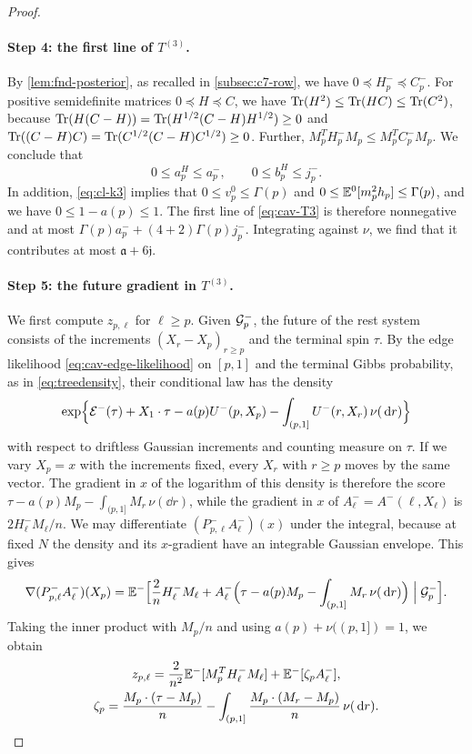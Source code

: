 \begin{proof}
\paragraph{Step 4: the first line of $T^{(3)}$.}
By \cref{lem:fnd-posterior}, as recalled in \cref{subsec:c7-row}, we
have $0\preceq H_p^-\preceq C_p^-$. For positive semidefinite matrices
$0\preceq H\preceq C$, we have
$\operatorname{Tr}(H^2)\le\operatorname{Tr}(HC)\le\operatorname{Tr}(C^2)$, because
$\operatorname{Tr}(H(C-H))=\operatorname{Tr}(H^{1/2}(C-H)H^{1/2})\ge0$ and
$\operatorname{Tr}((C-H)C)=\operatorname{Tr}(C^{1/2}(C-H)C^{1/2})\ge0$. Further,
$M_p^TH_p^-M_p\le M_p^TC_p^-M_p$. We conclude that
\[
 0\le a_p^H\le a_p^-,\qquad 0\le b_p^H\le j_p^-.
\]
In addition, \eqref{eq:cl-k3} implies that $0\le v_p^0\le\Gamma(p)$ and
$0\le\mathbb E^0[m_p^2h_p]\le\Gamma(p)$, and we have $0\le1-a(p)\le1$. The first line
of \eqref{eq:cav-T3} is therefore nonnegative and at most
$\Gamma(p)a_p^-+(4+2)\Gamma(p)j_p^-$. Integrating against $\nu$, we
find that it contributes at most $\mathfrak a+6\mathfrak j$.

\paragraph{Step 5: the future gradient in $T^{(3)}$.}
We first compute $z_{p,\ell}$ for $\ell\ge p$. Given $\mathcal G_p^-$, the
future of the rest system consists of the increments
$(X_r-X_p)_{r\ge p}$ and the terminal spin $\tau$. By the edge
likelihood \eqref{eq:cav-edge-likelihood} on $[p,1]$ and the terminal
Gibbs probability, as in \eqref{eq:treedensity}, their conditional law
has the density
\[
 \exp\Bigl\{\mathcal E^-(\tau)+X_1\cdot\tau-a(p)U^-(p,X_p)
 -\int_{(p,1]}U^-(r,X_r)\,\nu(\,\mathrm d r)\Bigr\}
\]
with respect to driftless Gaussian increments and counting measure on
$\tau$. If we vary $X_p=x$ with the increments fixed, every $X_r$ with
$r\ge p$ moves by the same vector. The gradient in $x$ of the
logarithm of this density is therefore the score
$\tau-a(p)M_p-\int_{(p,1]}M_r\,\nu(\dd r)$, while the gradient in $x$
of $A_\ell^-=A^-(\ell,X_\ell)$ is $2H_\ell^-M_\ell/n$. We may
differentiate $(P^-_{p,\ell}A_\ell^-)(x)$ under the integral, because at fixed $N$ the density and its $x$-gradient have an
integrable Gaussian envelope. This gives
\[
 \nabla(P^-_{p,\ell}A_\ell^-)(X_p)
 =\mathbb E^-\Bigl[\frac2nH_\ell^-M_\ell
 +A_\ell^-\Bigl(\tau-a(p)M_p-\int_{(p,1]}M_r\,\nu(\,\mathrm d r)\Bigr)
 \Bigm|\mathcal G^-_p\Bigr].
\]
Taking the inner product with $M_p/n$ and using $a(p)+\nu((p,1])=1$,
we obtain
\begin{equation}\label{eq:c7-future-gradient}
 \begin{gathered}
 z_{p,\ell}=\frac2{n^2}\mathbb E^-[M_p^TH_\ell^-M_\ell]+\mathbb E^-[\zeta_pA_\ell^-],
 \\
 \zeta_p=\frac{M_p\cdot(\tau-M_p)}n
   -\int_{(p,1]}\frac{M_p\cdot(M_r-M_p)}n\,\nu(\,\mathrm d r).
 \end{gathered}
\end{equation}


\end{proof}
